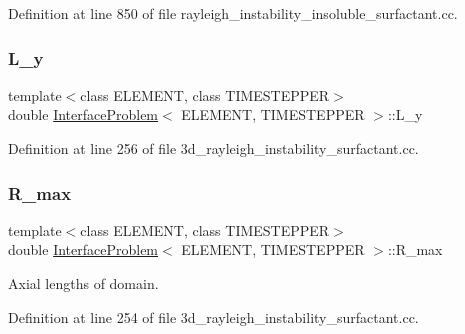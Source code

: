 Definition at line 850 of file rayleigh\+\_\+instability\+\_\+insoluble\+\_\+surfactant.\+cc.

\mbox{\label{classInterfaceProblem_af05142e27af8078fdb544bef158ab83d}} 
\subsubsection{\texorpdfstring{L\+\_\+y}{L\_y}}
{\footnotesize\ttfamily template$<$class E\+L\+E\+M\+E\+NT, class T\+I\+M\+E\+S\+T\+E\+P\+P\+ER$>$ \\
double \hyperlink{classInterfaceProblem}{Interface\+Problem}$<$ E\+L\+E\+M\+E\+NT, T\+I\+M\+E\+S\+T\+E\+P\+P\+ER $>$\+::L\+\_\+y\hspace{0.3cm}{\ttfamily [private]}}



Definition at line 256 of file 3d\+\_\+rayleigh\+\_\+instability\+\_\+surfactant.\+cc.

\mbox{\label{classInterfaceProblem_a9367afe223abf813838405a7d377767c}} 
\subsubsection{\texorpdfstring{R\+\_\+max}{R\_max}}
{\footnotesize\ttfamily template$<$class E\+L\+E\+M\+E\+NT, class T\+I\+M\+E\+S\+T\+E\+P\+P\+ER$>$ \\
double \hyperlink{classInterfaceProblem}{Interface\+Problem}$<$ E\+L\+E\+M\+E\+NT, T\+I\+M\+E\+S\+T\+E\+P\+P\+ER $>$\+::R\+\_\+max\hspace{0.3cm}{\ttfamily [private]}}



Axial lengths of domain. 



Definition at line 254 of file 3d\+\_\+rayleigh\+\_\+instability\+\_\+surfactant.\+cc.

\mbox{\label{classInterfaceProblem_a1b373c6e9f49bef78404511c53e622bb}} 
